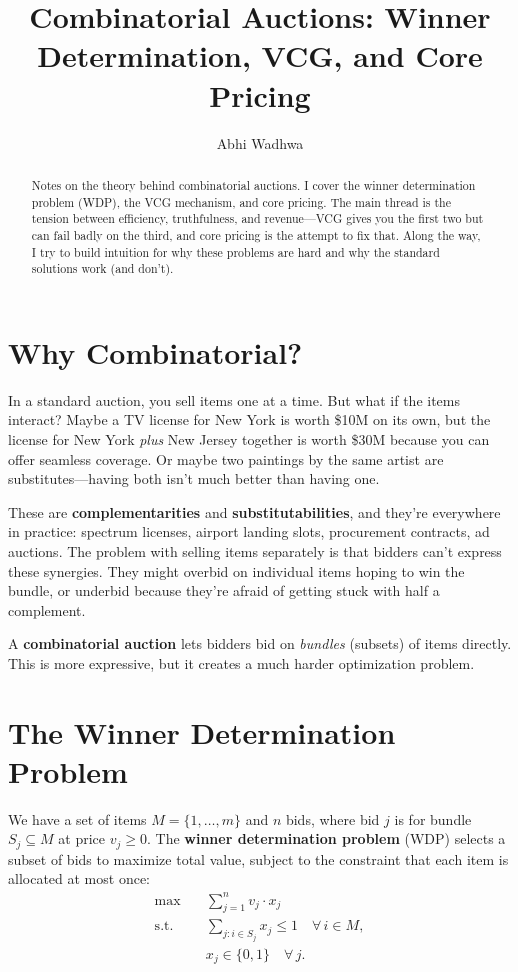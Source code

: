 \documentclass[11pt]{article}
\title{Combinatorial Auctions: Winner Determination, VCG, and Core Pricing}
\author{Abhi Wadhwa}
\date{}
\begin{document}
\maketitle

\begin{abstract}
Notes on the theory behind combinatorial auctions. I cover the winner determination problem (WDP), the VCG mechanism, and core pricing. The main thread is the tension between efficiency, truthfulness, and revenue---VCG gives you the first two but can fail badly on the third, and core pricing is the attempt to fix that. Along the way, I try to build intuition for why these problems are hard and why the standard solutions work (and don't).
\end{abstract}

\section{Why Combinatorial?}

In a standard auction, you sell items one at a time. But what if the items interact? Maybe a TV license for New York is worth \$10M on its own, but the license for New York \emph{plus} New Jersey together is worth \$30M because you can offer seamless coverage. Or maybe two paintings by the same artist are substitutes---having both isn't much better than having one.

These are \textbf{complementarities} and \textbf{substitutabilities}, and they're everywhere in practice: spectrum licenses, airport landing slots, procurement contracts, ad auctions. The problem with selling items separately is that bidders can't express these synergies. They might overbid on individual items hoping to win the bundle, or underbid because they're afraid of getting stuck with half a complement.

A \textbf{combinatorial auction} lets bidders bid on \emph{bundles} (subsets) of items directly. This is more expressive, but it creates a much harder optimization problem.

\section{The Winner Determination Problem}

We have a set of items $M = \{1, \ldots, m\}$ and $n$ bids, where bid $j$ is for bundle $S_j \subseteq M$ at price $v_j \geq 0$. The \textbf{winner determination problem} (WDP) selects a subset of bids to maximize total value, subject to the constraint that each item is allocated at most once:
\begin{align}
\max \quad & \sum_{j=1}^{n} v_j \cdot x_j \label{eq:wdp-obj} \\
\text{s.t.} \quad & \sum_{j : i \in S_j} x_j \leq 1 \quad \forall \, i \in M, \label{eq:wdp-item} \\
& x_j \in \{0, 1\} \quad \forall \, j. \label{eq:wdp-binary}
\end{align}
\end{document}
